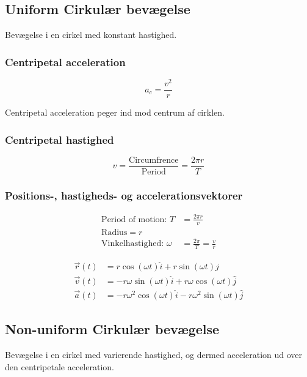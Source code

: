 \subsection{Uniform Cirkulær bevægelse}
Bevægelse i en cirkel med konstant hastighed.

\subsubsection{Centripetal acceleration}

\[
    a_c = \frac{v^2}{r}
\]

Centripetal acceleration peger ind mod centrum af cirklen.

\subsubsection{Centripetal hastighed}
\[
    v = \frac{\text{Circumfrence}}{\text{Period}} = \frac{2\pi r}{T}
\]

\subsubsection{Positions-, hastigheds- og accelerationsvektorer}

\begin{minipage}
    {0.3\textwidth}
    \begin{align*}
        \text{Period of motion: } T &= \frac{2\pi r}{v} \\
        \text{Radius} = r & \\
        \text{Vinkelhastighed: } \omega &= \frac{2\pi}{T} = \frac{v}{r}
    \end{align*}
\end{minipage}
\hfill
\begin{minipage}
    {0.5\textwidth}
    \begin{align*}
        \vec r(t) &= r \cos(\omega t) \hat i + r \sin(\omega t) \hat j \\
        \vec v(t) &= -r\omega \sin(\omega t) \hat i + r\omega \cos(\omega t) \hat j \\
        \vec a(t) &= -r\omega^2 \cos(\omega t) \hat i - r\omega^2 \sin(\omega t) \hat j
    \end{align*}
\end{minipage}

\subsection{Non-uniform Cirkulær bevægelse}
Bevægelse i en cirkel med varierende hastighed, og dermed acceleration ud over den centripetale acceleration.

